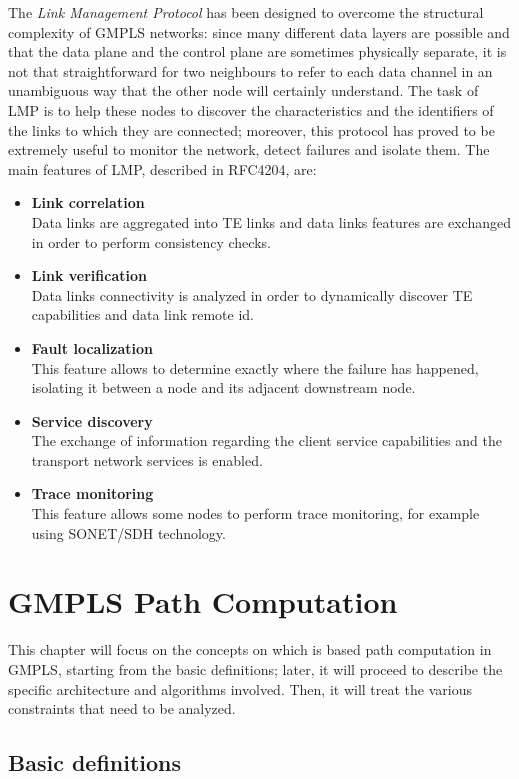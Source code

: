 \documentclass[10pt,a4paper]{report}
\begin{document}
The \textit{Link Management Protocol} has been designed to overcome
the structural complexity of GMPLS networks: since many different data
layers are possible and that the data plane and the control plane are
sometimes physically separate, it is not that straightforward for two
neighbours to refer to each data channel in an unambiguous way that
the other node will certainly understand. The task of LMP is to help
these nodes to discover the characteristics and the identifiers of the
links to which they are connected; moreover, this protocol has proved
to be extremely useful to monitor the network, detect failures and
isolate them. The main features of LMP, described in RFC4204, are:
\begin{itemize}
\item \textbf{Link correlation} \\
  Data links are aggregated into TE links and data links features are
  exchanged in order to perform consistency checks.
\item \textbf{Link verification} \\
  Data links connectivity is analyzed in order to dynamically discover
  TE capabilities and data link remote id.
\item \textbf{Fault localization} \\
  This feature allows to determine exactly where the failure has
  happened, isolating it between a node and its adjacent downstream
  node.
\item \textbf{Service discovery} \\
  The exchange of information regarding the client service
  capabilities and the transport network services is enabled.
\item \textbf{Trace monitoring} \\
  This feature allows some nodes to perform trace monitoring, for
  example using SONET/SDH technology.
\end{itemize}

\chapter{GMPLS Path Computation}

This chapter will focus on the concepts on which is based path
computation in GMPLS, starting from the basic definitions; later, it
will proceed to describe the specific architecture and algorithms
involved. Then, it will treat the various constraints that need to be
analyzed.

\section{Basic definitions}
\end{document}
